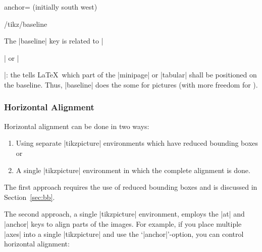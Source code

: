 \begin{pgfplotskey}{anchor= (initially south west)}
\begin{key}{/tikz/baseline}
\begin{codeexample}[]
\pgfplotsset{domain=-1:1}
%
\hspace{0.15cm}
\end{codeexample}
\end{key}
The |baseline| key is related to |\begin{minipage}| or |\begin{tabular}|: the  tells \LaTeX\ which part of the |minipage| or |tabular| shall be positioned on the baseline. Thus, |baseline| does the some for pictures (with more freedom for ).

\subsubsection{Horizontal Alignment}
\label{sec:halign}%
Horizontal alignment can be done in two ways:
\begin{enumerate}
	\item Using separate |tikzpicture| environments which have reduced bounding boxes or
	\item A single |tikzpicture| environment in which the complete alignment is done.
\end{enumerate}
The first approach requires the use of reduced bounding boxes and is discussed in Section~\ref{sec:bb}.

The second approach, a single |tikzpicture| environment, employs the |at| and |anchor| keys to align parts of the images. For example, if you place multiple |axes| into a single |tikzpicture| and use the `|anchor|'-option, you can control horizontal alignment:
\begin{codeexample}[]
\end{codeexample}
\end{tabular}
\end{minipage}
\end{pgfplotskey}
